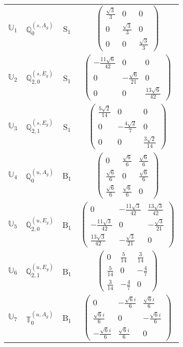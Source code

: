 \documentclass[fleqn,10pt,landscape]{article}
\begin{document}
\begin{itemize}
\begin{center}
\begin{longtable}{c|c|c|c}
$ \mathbb{U}_{1} $ & $\mathbb{Q}_{0}^{(s,A_{g})}$ & S$_{1}$ & $\begin{pmatrix} \frac{\sqrt{3}}{3} & 0 & 0 \\ 0 & \frac{\sqrt{3}}{3} & 0 \\ 0 & 0 & \frac{\sqrt{3}}{3} \end{pmatrix}$ \\
$ \mathbb{U}_{2} $ & $\mathbb{Q}_{2,0}^{(s,E_{g})}$ & S$_{1}$ & $\begin{pmatrix} - \frac{11 \sqrt{6}}{42} & 0 & 0 \\ 0 & - \frac{\sqrt{6}}{21} & 0 \\ 0 & 0 & \frac{13 \sqrt{6}}{42} \end{pmatrix}$ \\
$ \mathbb{U}_{3} $ & $\mathbb{Q}_{2,1}^{(s,E_{g})}$ & S$_{1}$ & $\begin{pmatrix} \frac{5 \sqrt{2}}{14} & 0 & 0 \\ 0 & - \frac{4 \sqrt{2}}{7} & 0 \\ 0 & 0 & \frac{3 \sqrt{2}}{14} \end{pmatrix}$ \\ \hline
$ \mathbb{U}_{4} $ & $\mathbb{Q}_{0}^{(u,A_{g})}$ & B$_{1}$ & $\begin{pmatrix} 0 & \frac{\sqrt{6}}{6} & \frac{\sqrt{6}}{6} \\ \frac{\sqrt{6}}{6} & 0 & \frac{\sqrt{6}}{6} \\ \frac{\sqrt{6}}{6} & \frac{\sqrt{6}}{6} & 0 \end{pmatrix}$ \\
$ \mathbb{U}_{5} $ & $\mathbb{Q}_{2,0}^{(u,E_{g})}$ & B$_{1}$ & $\begin{pmatrix} 0 & - \frac{11 \sqrt{3}}{42} & \frac{13 \sqrt{3}}{42} \\ - \frac{11 \sqrt{3}}{42} & 0 & - \frac{\sqrt{3}}{21} \\ \frac{13 \sqrt{3}}{42} & - \frac{\sqrt{3}}{21} & 0 \end{pmatrix}$ \\
$ \mathbb{U}_{6} $ & $\mathbb{Q}_{2,1}^{(u,E_{g})}$ & B$_{1}$ & $\begin{pmatrix} 0 & \frac{5}{14} & \frac{3}{14} \\ \frac{5}{14} & 0 & - \frac{4}{7} \\ \frac{3}{14} & - \frac{4}{7} & 0 \end{pmatrix}$ \\
$ \mathbb{U}_{7} $ & $\mathbb{T}_{0}^{(u,A_{g})}$ & B$_{1}$ & $\begin{pmatrix} 0 & - \frac{\sqrt{6} i}{6} & \frac{\sqrt{6} i}{6} \\ \frac{\sqrt{6} i}{6} & 0 & - \frac{\sqrt{6} i}{6} \\ - \frac{\sqrt{6} i}{6} & \frac{\sqrt{6} i}{6} & 0 \end{pmatrix}$ \\

\end{longtable}
\end{center}
\end{itemize}
\end{document}
